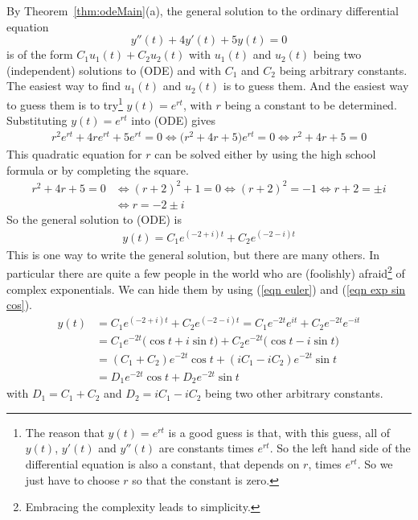 \begin{eg}\label{eg complex ode A}
By Theorem~\ref{thm:odeMain}(a), the general solution to the ordinary differential equation
\begin{equation*}
y''(t)+4y'(t)+5y(t)=0
\tag{ODE}
\end{equation*}
is of the form $C_1 u_1(t)+C_2 u_2(t)$ with $u_1(t)$ and $u_2(t)$ being
two (independent) solutions to (ODE) and with $C_1$ and $C_2$
being arbitrary constants. The easiest way to find
$u_1(t)$ and $u_2(t)$ is to guess them. And the easiest way to guess them
is to try\footnote{The reason that $y(t)=e^{rt}$ is a good guess
is that, with this guess, all of $y(t)$, $y'(t)$ and $y''(t)$ are constants
times $e^{rt}$. So the left hand side of the differential equation is
also a constant, that depends on $r$, times $e^{rt}$. So we just have to
choose $r$ so that the constant is zero.} 
$y(t)=e^{rt}$, with $r$ being a constant to be determined.
Substituting $y(t)=e^{rt}$ into (ODE) gives
\begin{align*}
r^2 e^{rt} +4re^{rt}+5e^{rt}=0
\iff\big(r^2 +4r+5\big)e^{rt}=0
\iff r^2 +4r+5=0
\end{align*}
This quadratic equation for $r$ can be solved either by using the high
school formula or by completing the square.
\begin{align*}
r^2 +4r+5=0
&\iff (r+2)^2+1=0
\iff (r+2)^2=-1
\iff r+2=\pm i \\
&\iff r=-2\pm i
\end{align*}
So the general solution to (ODE) is
\begin{align*}
y(t)=C_1e^{(-2+i)t} + C_2e^{(-2-i)t}
\end{align*}
This is one way to write the general solution, but there are many others.
In particular there are quite a few people in the world who are (foolishly)
afraid\footnote{Embracing the complexity leads to simplicity.} of complex exponentials. We can hide them by using (\ref{eqn euler}) and
(\ref{eqn exp sin cos}).
\begin{align*}
y(t)&=C_1e^{(-2+i)t} + C_2e^{(-2-i)t}
     =C_1e^{-2t}e^{it} + C_2 e^{-2t}e^{-it} \\
     &=C_1e^{-2t}\big(\cos t+i\sin t \big) 
       +C_2 e^{-2t}\big(\cos t-i\sin t \big) \\
     &=(C_1+C_2) e^{-2t} \cos t 
       +(iC_1-iC_2) e^{-2t}\sin t \\
     &=D_1 e^{-2t} \cos t 
       +D_2 e^{-2t}\sin t 
\end{align*}
with $D_1=C_1+C_2$ and $D_2=iC_1-iC_2$ being two other arbitrary constants.

\end{eg}
